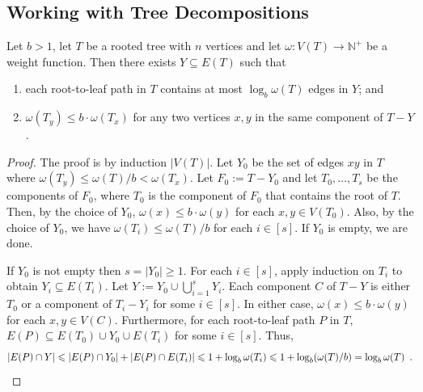 
\subsection{Working with Tree Decompositions}
\label{working_with_tree_decomps}



\begin{lem}\label{skinny_edges}
  Let $b>1$, let $T$ be a rooted tree with $n$ vertices and let $\omega:V(T)\to\mathbb{N}^+$ be a weight function.  Then there exists $Y\subseteq E(T)$ such that
  \begin{enumerate}[nosep,nolistsep,label=\rm(\alph*)] 
    \item each root-to-leaf path in $T$ contains at most $\log_b \omega(T)$ edges in $Y$; and
    \item $\omega(T_y)\le b\cdot\omega(T_x)$ for any two vertices $x,y$ in the same component of $T-Y$.
  \end{enumerate}
\end{lem}

\begin{proof}
  The proof is by induction $|V(T)|$.  Let $Y_0$ be the set of edges $xy$ in $T$ where $\omega(T_y)\le \omega(T)/b< \omega(T_x)$.  Let $F_0:=T-Y_0$ and let $T_0,\ldots,T_{s}$ be the components of $F_0$, where $T_0$ is the component of $F_0$ that contains the root of $T$. Then, by the choice of $Y_0$, $\omega(x)\le b\cdot\omega(y)$ for each $x,y\in V(T_0)$.  Also, by the choice of $Y_0$, we have $\omega(T_i) \le \omega(T)/b$ for each $i\in[s]$.  If $Y_0$ is empty, we are done.  
  
  If $Y_0$ is not empty then $s=|Y_0|\ge 1$.  For each $i\in[s]$, apply induction on $T_i$ to obtain $Y_i\subseteq E(T_i)$.  Let $Y:=Y_0\cup\bigcup_{i=1}^s Y_i$.  Each component $C$ of $T-Y$ is either $T_0$ or a component of $T_i-Y_i$ for some $i\in[s]$.  In either case, $\omega(x)\le b\cdot\omega(y)$ for each $x,y\in V(C)$.  Furthermore, for each root-to-leaf path $P$ in $T$, $E(P)\subseteq E(T_0)\cup Y_0\cup E(T_i)$ for some $i\in[s]$.  Thus,
  \[  
    |E(P)\cap Y|
      \le |E(P)\cap Y_0| + |E(P)\cap E(T_i)|
      \le 1+\log_b\omega(T_i)\le 1+\log_b(\omega(T)/b)
      =\log_b\omega(T) \enspace . \qedhere 
  \]
\end{proof}


